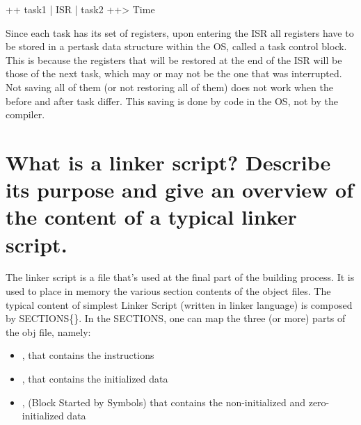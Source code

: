 ++ task1 | ISR | task2 ++> Time


Since each task has its set of registers, upon entering the ISR all registers have to be stored in a per­task data structure within the OS, called a task control block. This is because the registers that will be restored at the end of the ISR will be those of the next task, which may or may not be the one that was interrupted. Not saving all of them (or not restoring all of them) does not work when the before and after task differ. This saving is done by code in the OS, not by the compiler.

\section{What is a linker script? Describe its purpose and give an overview of the content of a typical linker script.}
The linker script is a file that's used at the final part of the building process. It is used to place in memory the various section contents of the object files. 
The typical content of simplest Linker Script (written in linker language) is composed by SECTIONS\{\}.
In the SECTIONS, one can map the three (or more) parts of the obj file, namely:
\begin{itemize}
	\item {}, that contains the instructions
	\item {}, that contains the initialized data
	\item {}, (Block Started by Symbols) that contains the non-initialized and zero-initialized data
\end{itemize}


